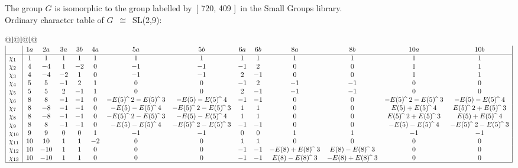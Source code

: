 \documentclass[varwidth=\maxdimen,border=10]{standalone}
\begin{document}
The group $G$ is isomorphic to the group labelled by\ [ 720, 409 ]\ in the Small Groups library.\\
Ordinary character table of $G$\ $\cong$\ SL(2,9):\\
\begin{center}
\begin{tabular}{@{}l@{}l@{}l@{}}
\hline
\(\begin{array}{|l|ccccccccccccc|}
  & 1a & 2a & 3a & 3b & 4a & 5a & 5b & 6a & 6b & 8a & 8b & 10a & 10b\\ \hline
\chi_{1} & 1 & 1 & 1 & 1 & 1 & 1 & 1 & 1 & 1 & 1 & 1 & 1 & 1\\
\chi_{2} & 4 & -4 & 1 & -2 & 0 & -1 & -1 & -1 & 2 & 0 & 0 & 1 & 1\\
\chi_{3} & 4 & -4 & -2 & 1 & 0 & -1 & -1 & 2 & -1 & 0 & 0 & 1 & 1\\
\chi_{4} & 5 & 5 & -1 & 2 & 1 & 0 & 0 & -1 & 2 & -1 & -1 & 0 & 0\\
\chi_{5} & 5 & 5 & 2 & -1 & 1 & 0 & 0 & 2 & -1 & -1 & -1 & 0 & 0\\
\chi_{6} & 8 & 8 & -1 & -1 & 0 & -E(5) \widehat{\ }\ {2}-E(5) \widehat{\ }\ {3} & -E(5)-E(5) \widehat{\ }\ {4} & -1 & -1 & 0 & 0 & -E(5) \widehat{\ }\ {2}-E(5) \widehat{\ }\ {3} & -E(5)-E(5) \widehat{\ }\ {4}\\
\chi_{7} & 8 & -8 & -1 & -1 & 0 & -E(5)-E(5) \widehat{\ }\ {4} & -E(5) \widehat{\ }\ {2}-E(5) \widehat{\ }\ {3} & 1 & 1 & 0 & 0 & E(5)+E(5) \widehat{\ }\ {4} & E(5) \widehat{\ }\ {2}+E(5) \widehat{\ }\ {3}\\
\chi_{8} & 8 & -8 & -1 & -1 & 0 & -E(5) \widehat{\ }\ {2}-E(5) \widehat{\ }\ {3} & -E(5)-E(5) \widehat{\ }\ {4} & 1 & 1 & 0 & 0 & E(5) \widehat{\ }\ {2}+E(5) \widehat{\ }\ {3} & E(5)+E(5) \widehat{\ }\ {4}\\
\chi_{9} & 8 & 8 & -1 & -1 & 0 & -E(5)-E(5) \widehat{\ }\ {4} & -E(5) \widehat{\ }\ {2}-E(5) \widehat{\ }\ {3} & -1 & -1 & 0 & 0 & -E(5)-E(5) \widehat{\ }\ {4} & -E(5) \widehat{\ }\ {2}-E(5) \widehat{\ }\ {3}\\
\chi_{10} & 9 & 9 & 0 & 0 & 1 & -1 & -1 & 0 & 0 & 1 & 1 & -1 & -1\\
\chi_{11} & 10 & 10 & 1 & 1 & -2 & 0 & 0 & 1 & 1 & 0 & 0 & 0 & 0\\
\chi_{12} & 10 & -10 & 1 & 1 & 0 & 0 & 0 & -1 & -1 & -E(8)+E(8) \widehat{\ }\ {3} & E(8)-E(8) \widehat{\ }\ {3} & 0 & 0\\
\chi_{13} & 10 & -10 & 1 & 1 & 0 & 0 & 0 & -1 & -1 & E(8)-E(8) \widehat{\ }\ {3} & -E(8)+E(8) \widehat{\ }\ {3} & 0 & 0\\
\hline
\end{array}\)\\
\end{tabular}
\end{center}
\end{document}
